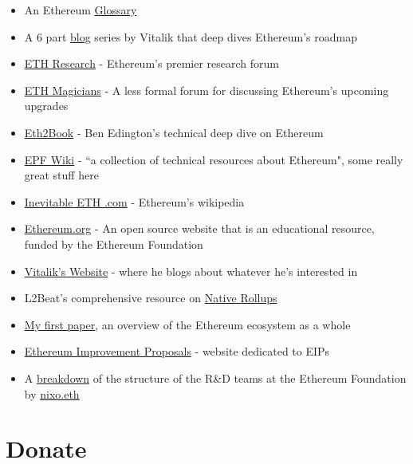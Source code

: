 \documentclass[12pt]{article}
\begin{document}
\begin{itemize}
\subsection{Technical Resources and Reading Materials}
    \item An Ethereum \href{https://ethereum.org/glossary/#proof-of-stake}{Glossary}
    \item A 6 part \href{https://vitalik.eth.limo/general/2024/10/14/futures1.html}{blog} series by Vitalik that deep dives Ethereum's roadmap
    \item \href{https://ethresear.ch/}{ETH Research} - Ethereum's premier research forum
    \item \href{https://ethereum-magicians.org/}{ETH Magicians} - A less formal forum for discussing Ethereum's upcoming upgrades
    \item \href{https://eth2book.info/latest/}{Eth2Book} - Ben Edington's technical deep dive on Ethereum
    \item \href{https://epf.wiki/#/}{EPF Wiki} - ``a collection of technical resources about Ethereum", some really great stuff here
    \item \href{https://inevitableeth.com/}{Inevitable ETH .com} - Ethereum's wikipedia
    \item \href{https://ethereum.org/}{Ethereum.org} - An open source website that is an educational resource, funded by the Ethereum Foundation
    \item \href{https://vitalik.eth.limo/}{Vitalik's Website} - where he blogs about whatever he's interested in
    \item L2Beat's comprehensive resource on \href{https://native-rollups.l2beat.com/}{Native Rollups}
    \item \href{https://x.com/ib1gymnast/status/1475296136277606401}{My first paper}, an overview of the Ethereum ecosystem as a whole
    \item \href{https://eips.ethereum.org/}{Ethereum Improvement Proposals} - website dedicated to EIPs
    \item A \href{https://mirror.xyz/nixo.eth/TS-GwCEAKD_UTOE2_SCA_eFWyHstVAtGGn2Hu8mMezQ}{breakdown} of the structure of the R\&D teams at the Ethereum Foundation by \href{https://x.com/nixorokish}{nixo.eth}
    
\end{itemize}

\section{Donate}
\end{document}
